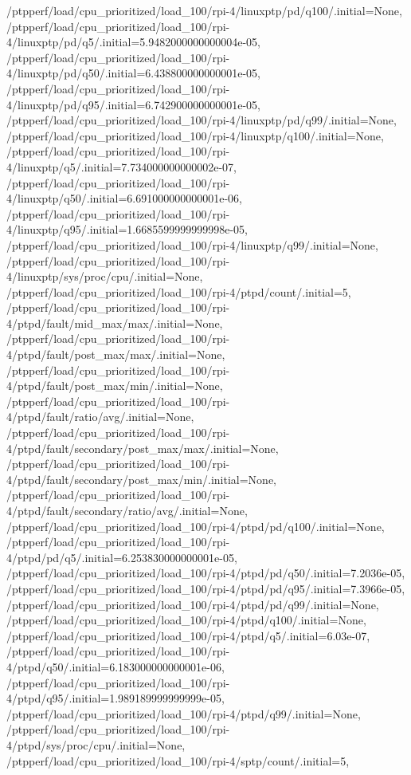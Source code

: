 {    /ptpperf/load/cpu_prioritized/load_100/rpi-4/linuxptp/pd/q100/.initial=None,
    /ptpperf/load/cpu_prioritized/load_100/rpi-4/linuxptp/pd/q5/.initial=5.9482000000000004e-05,
    /ptpperf/load/cpu_prioritized/load_100/rpi-4/linuxptp/pd/q50/.initial=6.438800000000001e-05,
    /ptpperf/load/cpu_prioritized/load_100/rpi-4/linuxptp/pd/q95/.initial=6.742900000000001e-05,
    /ptpperf/load/cpu_prioritized/load_100/rpi-4/linuxptp/pd/q99/.initial=None,
    /ptpperf/load/cpu_prioritized/load_100/rpi-4/linuxptp/q100/.initial=None,
    /ptpperf/load/cpu_prioritized/load_100/rpi-4/linuxptp/q5/.initial=7.734000000000002e-07,
    /ptpperf/load/cpu_prioritized/load_100/rpi-4/linuxptp/q50/.initial=6.691000000000001e-06,
    /ptpperf/load/cpu_prioritized/load_100/rpi-4/linuxptp/q95/.initial=1.6685599999999998e-05,
    /ptpperf/load/cpu_prioritized/load_100/rpi-4/linuxptp/q99/.initial=None,
    /ptpperf/load/cpu_prioritized/load_100/rpi-4/linuxptp/sys/proc/cpu/.initial=None,
    /ptpperf/load/cpu_prioritized/load_100/rpi-4/ptpd/count/.initial=5,
    /ptpperf/load/cpu_prioritized/load_100/rpi-4/ptpd/fault/mid_max/max/.initial=None,
    /ptpperf/load/cpu_prioritized/load_100/rpi-4/ptpd/fault/post_max/max/.initial=None,
    /ptpperf/load/cpu_prioritized/load_100/rpi-4/ptpd/fault/post_max/min/.initial=None,
    /ptpperf/load/cpu_prioritized/load_100/rpi-4/ptpd/fault/ratio/avg/.initial=None,
    /ptpperf/load/cpu_prioritized/load_100/rpi-4/ptpd/fault/secondary/post_max/max/.initial=None,
    /ptpperf/load/cpu_prioritized/load_100/rpi-4/ptpd/fault/secondary/post_max/min/.initial=None,
    /ptpperf/load/cpu_prioritized/load_100/rpi-4/ptpd/fault/secondary/ratio/avg/.initial=None,
    /ptpperf/load/cpu_prioritized/load_100/rpi-4/ptpd/pd/q100/.initial=None,
    /ptpperf/load/cpu_prioritized/load_100/rpi-4/ptpd/pd/q5/.initial=6.253830000000001e-05,
    /ptpperf/load/cpu_prioritized/load_100/rpi-4/ptpd/pd/q50/.initial=7.2036e-05,
    /ptpperf/load/cpu_prioritized/load_100/rpi-4/ptpd/pd/q95/.initial=7.3966e-05,
    /ptpperf/load/cpu_prioritized/load_100/rpi-4/ptpd/pd/q99/.initial=None,
    /ptpperf/load/cpu_prioritized/load_100/rpi-4/ptpd/q100/.initial=None,
    /ptpperf/load/cpu_prioritized/load_100/rpi-4/ptpd/q5/.initial=6.03e-07,
    /ptpperf/load/cpu_prioritized/load_100/rpi-4/ptpd/q50/.initial=6.183000000000001e-06,
    /ptpperf/load/cpu_prioritized/load_100/rpi-4/ptpd/q95/.initial=1.989189999999999e-05,
    /ptpperf/load/cpu_prioritized/load_100/rpi-4/ptpd/q99/.initial=None,
    /ptpperf/load/cpu_prioritized/load_100/rpi-4/ptpd/sys/proc/cpu/.initial=None,
    /ptpperf/load/cpu_prioritized/load_100/rpi-4/sptp/count/.initial=5,
}
